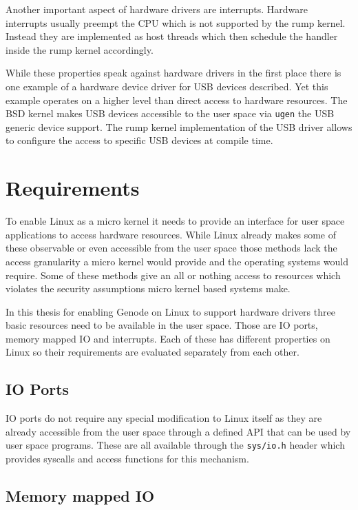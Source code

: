 \documentclass[
a4paper,
12pt,
notitlepage,
parskip=half,
DIV=11,
]{scrbook}
\begin{document}
		Another important aspect of hardware drivers are interrupts.
		Hardware interrupts usually preempt the CPU which is not supported by the rump kernel.
		Instead they are implemented as host threads which then schedule the handler inside the rump kernel accordingly. \citep{kantee}
		
		While these properties speak against hardware drivers in the first place there is one example of a hardware device driver for USB devices described.
		Yet this example operates on a higher level than direct access to hardware resources.
		The BSD kernel makes USB devices accessible to the user space via \texttt{ugen} the USB generic device support.
		The rump kernel implementation of the USB driver allows to configure the access to specific USB devices at compile time. \citep{kantee} \citep{ugen}
		
	\chapter{Requirements} %
	
		To enable Linux as a micro kernel it needs to provide an interface for user space applications to access hardware resources.
		While Linux already makes some of these observable or even accessible from the user space those methods lack the access granularity a micro kernel would provide and the operating systems would require.
		Some of these methods give an all or nothing access to resources which violates the security assumptions micro kernel based systems make.
	
		In this thesis for enabling Genode on Linux to support hardware drivers three basic resources need to be available in the user space.
		Those are IO ports, memory mapped IO and interrupts.
		Each of these has different properties on Linux so their requirements are evaluated separately from each other.
		
		\section{IO Ports}
		
		IO ports do not require any special modification to Linux itself as they are already accessible from the user space through a defined API that can be used by user space programs.
		These are all available through the \texttt{sys/io.h} header which provides syscalls and access functions for this mechanism. \citep{ioperm} \citep{iopl} \citep{outb}
	
		\section{Memory mapped IO}
		
\end{document}
